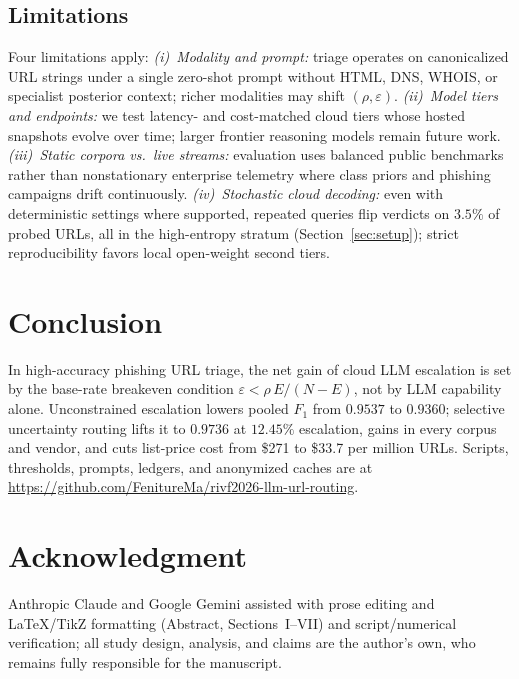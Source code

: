 \documentclass[conference,a4paper]{IEEEtran}
\newcommand{\eps}{\varepsilon}
\newcommand{\rrescue}{\rho}
\begin{document}
\subsection{Limitations}
Four limitations apply:
\emph{(i)~Modality and prompt:} triage operates on canonicalized URL strings under a
single zero-shot prompt without HTML, DNS, WHOIS, or specialist posterior context;
richer modalities may shift $(\rrescue,\eps)$.
\emph{(ii)~Model tiers and endpoints:} we test latency- and cost-matched cloud
tiers whose hosted snapshots evolve over time; larger frontier reasoning models
remain future work.
\emph{(iii)~Static corpora vs.\ live streams:} evaluation uses balanced public
benchmarks rather than nonstationary enterprise telemetry where class priors and
phishing campaigns drift continuously.
\emph{(iv)~Stochastic cloud decoding:} even with deterministic settings where
supported, repeated queries flip verdicts on $3.5\%$ of probed URLs, all in the
high-entropy stratum (Section~\ref{sec:setup}); strict reproducibility favors local
open-weight second tiers.

\section{Conclusion}
\label{sec:conclusion}
In high-accuracy phishing URL triage, the net gain of cloud LLM escalation is set by
the base-rate breakeven condition $\eps < \rrescue\,E/(N-E)$, not by LLM capability
alone. Unconstrained escalation lowers pooled $F_1$ from $0.9537$ to $0.9360$;
selective uncertainty routing lifts it to $0.9736$ at $12.45\%$ escalation, gains in
every corpus and vendor, and cuts list-price cost from \$271 to \$33.7 per million
URLs. Scripts, thresholds, prompts, ledgers, and anonymized caches are at
\url{https://github.com/FenitureMa/rivf2026-llm-url-routing}.

\section*{Acknowledgment}
Anthropic Claude and Google Gemini assisted with prose
editing and \LaTeX/TikZ formatting (Abstract, Sections~I--VII) and script/numerical
verification; all study design, analysis, and claims are the author's own, who
remains fully responsible for the manuscript.
\end{document}
